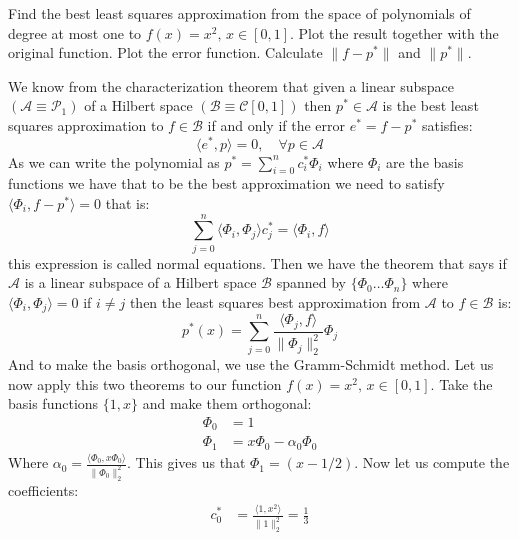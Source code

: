 \begin{problem}
Find the best least squares approximation from the space of polynomials of degree at most one to $f(x) = x^2, \, x \in [0,1]$. Plot the result together with the original function. Plot the error function. Calculate $\lVert f - p^*\rVert$ and $\lVert p^*\rVert$.
\end{problem}

\begin{solution}
We know from the characterization theorem that given a linear subspace $(\mathcal{A} \equiv \mathcal{P}_1)$ of a Hilbert space $(\mathcal{B} \equiv \mathcal{C}[0,1])$ then $p^* \in \mathcal{A}$ is the best least squares approximation to $f \in \mathcal{B}$ if and only if the error $e^* = f - p^*$ satisfies:
\begin{equation*}
\langle e^*,p \rangle = 0, \quad \forall p \in \mathcal{A}
\end{equation*}
As we can write the polynomial as $p^* = \sum_{i=0}^n c_i^* \Phi_i$ where $\Phi_i$ are the basis functions we have that to be the best approximation we need to satisfy $\langle \Phi_i, f-p^* \rangle=0$ that is:
\begin{equation*}
\sum_{j=0}^n \langle \Phi_i,\Phi_j\rangle c_j^* = \langle \Phi_i,f\rangle
\end{equation*}
this expression is called normal equations. Then we have the theorem that says if $\mathcal{A}$ is a linear subspace of  a Hilbert space $\mathcal{B}$ spanned by $\{\Phi_0 \ldots \Phi_n\}$ where $\langle \Phi_i,\Phi_j \rangle = 0$ if $i \neq j$ then the least squares best approximation from $\mathcal{A}$ to $f \in \mathcal{B}$ is:
\begin{equation}
p^*(x) = \sum_{j=0}^n \frac{\langle \Phi_j, f\rangle}{\lVert\Phi_j\rVert_2^2}\Phi_j
\label{bestlsq}
\end{equation}
And to make the basis orthogonal, we use the Gramm-Schmidt method. Let us now apply this two theorems to our function $f(x) = x^2, \, x\in[0,1]$. Take the basis functions $\{1,x\}$ and make them orthogonal:
\begin{align*}
\Phi_0 &= 1 \\
\Phi_1 &=x\Phi_0 - \alpha_0\Phi_0
\end{align*}
Where $\alpha_0 = \frac{\langle \Phi_0, x\Phi_0 \rangle}{\lVert \Phi_0 \rVert_2^2}$. This gives us that $\Phi_1 = (x-1/2)$. Now let us compute the coefficients:
\begin{align*}
c_0^* &= \frac{\langle 1,x^2 \rangle}{\lVert 1 \rVert_2^2}=\frac{1}{3}\\

\end{align*}
\end{solution}

